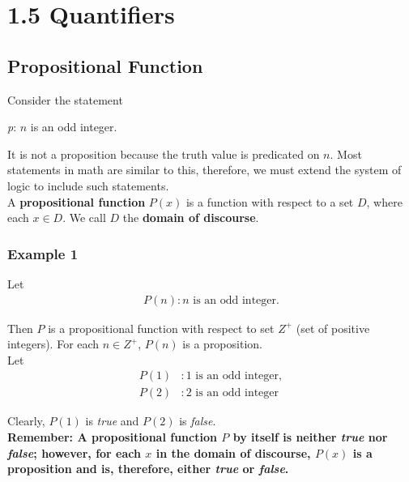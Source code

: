 \section*{1.5 Quantifiers}

\subsection*{Propositional Function}

Consider the statement
\begin{center}
\textit{p}: $n$ is an odd integer.
\end{center}

It is not a proposition because the truth value is predicated on $n$.  Most statements in math are similar to this, therefore, we must extend the system of logic to include such statements.\\

A \textbf{propositional function} $P(x)$ is a function with respect to a set $D$, where each $x \in D$.  We call $D$ the \textbf{domain of discourse}.

\subsubsection*{Example 1}

Let
\begin{align*}
P(n): n \text{ is an odd integer.}
\end{align*}

Then $P$ is a propositional function with respect to set $Z^+$ (set of positive integers).  For each $n \in Z^+$, $P(n)$ is a proposition.\\

Let
\begin{align*}
P(1)&: 1 \text{ is an odd integer},\\
P(2)&: 2 \text{ is an odd integer}
\end{align*}

Clearly, $P(1)$ is \textit{true} and $P(2)$ is \textit{false}.\\

\textbf{Remember: A propositional function $P$ by itself is neither \textit{true} nor \textit{false}; however, for each $x$ in the domain of discourse, $P(x)$ is a proposition and is, therefore, either \textit{true} or \textit{false}.}\\

